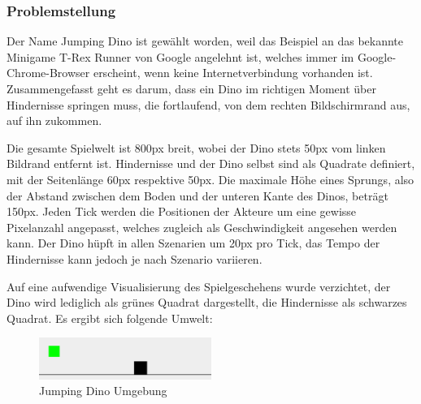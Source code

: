 \subsubsection{Problemstellung}
Der Name \glqq Jumping Dino\grqq{} ist gewählt worden, weil das Beispiel an das bekannte Minigame \glqq T-Rex Runner\grqq{} von Google angelehnt ist, welches immer im Google-Chrome-Browser erscheint, wenn keine Internetverbindung vorhanden ist. Zusammengefasst geht es darum, dass ein Dino im richtigen Moment über Hindernisse springen muss, die fortlaufend, von dem rechten Bildschirmrand aus, auf ihn zukommen.
\par 
Die gesamte Spielwelt ist 800px breit, wobei der Dino stets 50px vom linken Bildrand entfernt ist. Hindernisse und der Dino selbst sind als Quadrate definiert, mit der Seitenlänge 60px respektive 50px. Die maximale Höhe eines Sprungs, also der Abstand zwischen dem Boden und der unteren Kante des Dinos, beträgt 150px. Jeden Tick werden die Positionen der Akteure um eine gewisse Pixelanzahl angepasst, welches zugleich als Geschwindigkeit angesehen werden kann. Der Dino hüpft in allen Szenarien um 20px pro Tick, das Tempo der Hindernisse kann jedoch je nach Szenario variieren.
\par 
Auf eine aufwendige Visualisierung des Spielgeschehens wurde verzichtet, der Dino wird lediglich als grünes Quadrat dargestellt, die Hindernisse als schwarzes Quadrat. Es ergibt sich folgende Umwelt:
\begin{figure}[H]
    \begin{center}
    \includegraphics[width=0.5\textwidth]{images/jumpingDinoUmg.png}  \end{center}
    \caption{Jumping Dino Umgebung}
    \label{fig:jumpingDinoUmg}
\end{figure}


